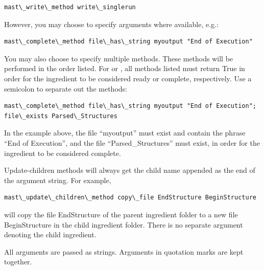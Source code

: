\documentclass[letterpaper,10pt,english]{sphinxmanual}
\begin{document}
\begin{Verbatim}[commandchars=\\\{\}]
mast\_write\_method write\_singlerun
\end{Verbatim}

However, you may choose to specify arguments where available, e.g.:

\begin{Verbatim}[commandchars=\\\{\}]
mast\_complete\_method file\_has\_string myoutput "End of Execution"
\end{Verbatim}

You may also choose to specify multiple methods. These methods will be performed in the order listed. For  or , all methods listed must return True in order for the ingredient to be considered ready or complete, respectively.
Use a semicolon to separate out the methods:

\begin{Verbatim}[commandchars=\\\{\}]
mast\_complete\_method file\_has\_string myoutput "End of Execution"; file\_exists Parsed\_Structures
\end{Verbatim}

In the example above, the file ``myoutput'' must exist and contain the phrase ``End of Execution'', and the file ``Parsed\_Structures'' must exist, in order for the ingredient to be considered complete.

Update-children methods will always get the child name appended as the end of the argument string. For example,

\begin{Verbatim}[commandchars=\\\{\}]
mast\_update\_children\_method copy\_file EndStructure BeginStructure
\end{Verbatim}

will copy the file EndStructure of the parent ingredient folder to a new file BeginStructure in the child ingredient folder. There is no separate argument denoting the child ingredient.

All arguments are passed as strings. Arguments in quotation marks are kept together.
\end{document}
